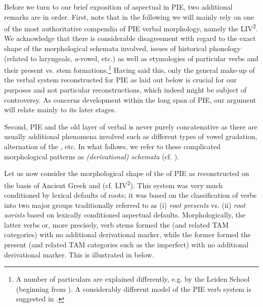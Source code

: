 \documentclass[output=paper]{langsci/langscibook}
\begin{document}
Before we turn to our brief exposition of aspectual  in PIE, two additional remarks are in order. First, note that in the following we will mainly rely on one of the most authoritative compendia of PIE verbal morphology, namely the LIV\textsuperscript{2}. We acknowledge that there is considerable disagreement with regard to the exact shape of the morphological schemata involved, issues of historical phonology (related to laryngeals, \textit{a}-vowel, etc.) as well as etymologies of particular verbs and their present vs.  stem formations.\footnote{A number of particulars are explained differently, e.g. by the Leiden School (beginning from \citealt{Beekes1969,Beekes1995}). A considerably different model of the PIE verb system is suggested in \citet{Jasanoff2003}.} Having said this, only the general make-up of the verbal system reconstructed for PIE as laid out below is crucial for our purposes and not particular reconstructions, which indeed might be subject of controversy. As concerns development within the long span of PIE, our argument will relate mainly to its later stages.

Second, PIE and the old layer of  verbal  is never purely concatenative as there are usually additional phenomena involved such as different types of vowel gradation, alternation of the , etc. In what follows, we refer to these complicated morphological patterns as \textit{(derivational) schemata} (cf.  \citealt[46--53]{Haspelmath2010}).

Let us now consider the morphological shape of the  of PIE as reconstructed on the basis of Ancient Greek and   (cf. LIV\textsuperscript{2}). This system was very much conditioned by lexical defaults of roots; it was based on the classification of verbs into two major groups traditionally referred to as (i) \textit{root presents} vs. (ii) \textit{root aorists} based on lexically conditioned aspectual defaults. Morphologically, the latter verbs or, more precisely, verb stems formed the  (and related TAM categories) with no additional derivational marker, while the former formed the present (and related TAM categories such as the imperfect) with no additional derivational marker. This is illustrated in  below.
\end{document}
